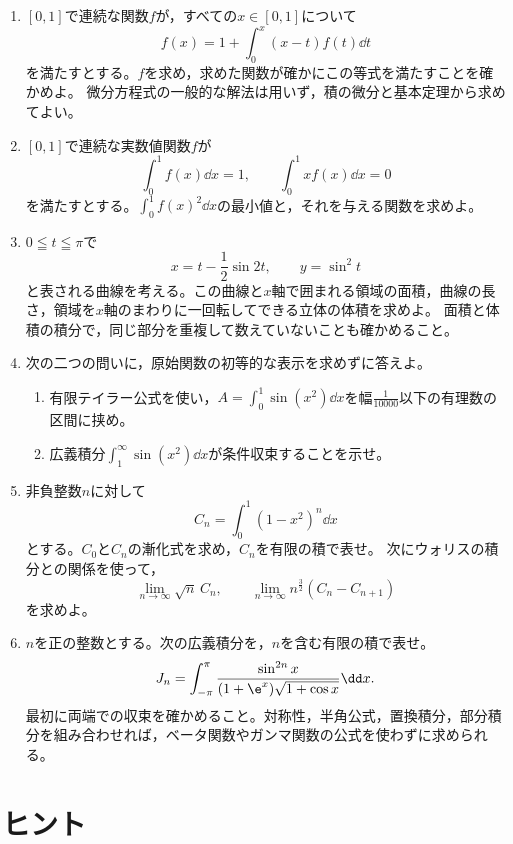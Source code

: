 \begin{enumerate}[label=\textbf{\thechapter.\arabic*},leftmargin=*,start=13]
 \item\label{問:総合十三積分方程式}
 $[0,1]$で連続な関数$f$が，すべての$x\in[0,1]$について
 \[
  f(x)=1+\int_0^x(x-t)f(t)\dd t
 \]
 を満たすとする。$f$を求め，求めた関数が確かにこの等式を満たすことを確かめよ。
 微分方程式の一般的な解法は用いず，積の微分と基本定理から求めてよい。
 \item\label{問:総合十四二つの制約}
 $[0,1]$で連続な実数値関数$f$が
 \[
  \int_0^1f(x)\dd x=1,\qquad
  \int_0^1xf(x)\dd x=0
 \]
 を満たすとする。$\int_0^1f(x)^2\dd x$の最小値と，それを与える関数を求めよ。
 \item\label{問:総合十五媒介曲線}
 $0\leqq t\leqq\pi$で
 \[
  x=t-\frac12\sin2t,\qquad y=\sin^2t
 \]
 と表される曲線を考える。この曲線と$x$軸で囲まれる領域の面積，曲線の長さ，領域を$x$軸のまわりに一回転してできる立体の体積を求めよ。
 面積と体積の積分で，同じ部分を重複して数えていないことも確かめること。
 \item\label{問:総合十六近似と条件収束}
 次の二つの問いに，原始関数の初等的な表示を求めずに答えよ。
 \begin{enumerate}[label=(\arabic*),leftmargin=*]
  \item 有限テイラー公式を使い，$A=\int_0^1\sin(x^2)\dd x$を幅$\frac1{10000}$以下の有理数の区間に挟め。
  \item 広義積分$\int_1^{\infty}\sin(x^2)\dd x$が条件収束することを示せ。
 \end{enumerate}
 \item\label{問:総合十七ウォリス}
 非負整数$n$に対して
 \[
  C_n=\int_0^1(1-x^2)^n\dd x
 \]
 とする。$C_0$と$C_n$の漸化式を求め，$C_n$を有限の積で表せ。
 次にウォリスの積分との関係を使って，
 \[
  \lim_{n\to\infty}\sqrt n\,C_n,
  \qquad
  \lim_{n\to\infty}n^{\frac32}(C_n-C_{n+1})
 \]
 を求めよ。
 \item\label{問:総合十八相補と半角}
 $n$を正の整数とする。次の広義積分を，$n$を含む有限の積で表せ。
 \[
  J_n=\int_{-\pi}^{\pi}
  \frac{\sin^{2n}x}{(1+\e^x)\sqrt{1+\cos x}}\dd x.
 \]
 最初に両端での収束を確かめること。対称性，半角公式，置換積分，部分積分を組み合わせれば，ベータ関数やガンマ関数の公式を使わずに求められる。
\end{enumerate}

\clearpage
\section{ヒント}\label{節:総合ヒント}

